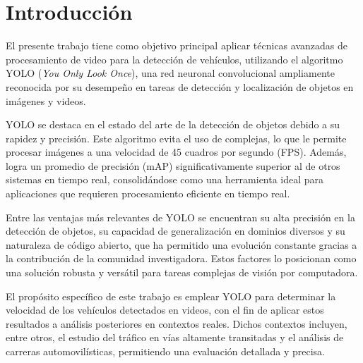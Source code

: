 \section{Introducción}

\noindent
El presente trabajo tiene como objetivo principal aplicar técnicas avanzadas de procesamiento de video para la detección de vehículos, utilizando el algoritmo YOLO (\textit{You Only Look Once}), una red neuronal convolucional ampliamente reconocida por su desempeño en tareas de detección y localización de objetos en imágenes y videos.

\noindent
YOLO se destaca en el estado del arte de la detección de objetos debido a su rapidez y precisión. Este algoritmo evita el uso de  complejas, lo que le permite procesar imágenes a una velocidad de 45 cuadros por segundo (FPS). Además, logra un promedio de precisión (mAP) significativamente superior al de otros sistemas en tiempo real, consolidándose como una herramienta ideal para aplicaciones que requieren procesamiento eficiente en tiempo real.

\noindent
Entre las ventajas más relevantes de YOLO se encuentran su alta precisión en la detección de objetos, su capacidad de generalización en dominios diversos y su naturaleza de código abierto, que ha permitido una evolución constante gracias a la contribución de la comunidad investigadora. Estos factores lo posicionan como una solución robusta y versátil para tareas complejas de visión por computadora.

\noindent
El propósito específico de este trabajo es emplear YOLO para determinar la velocidad de los vehículos detectados en videos, con el fin de aplicar estos resultados a análisis posteriores en contextos reales. Dichos contextos incluyen, entre otros, el estudio del tráfico en vías altamente transitadas y el análisis de carreras automovilísticas, permitiendo una evaluación detallada y precisa.

